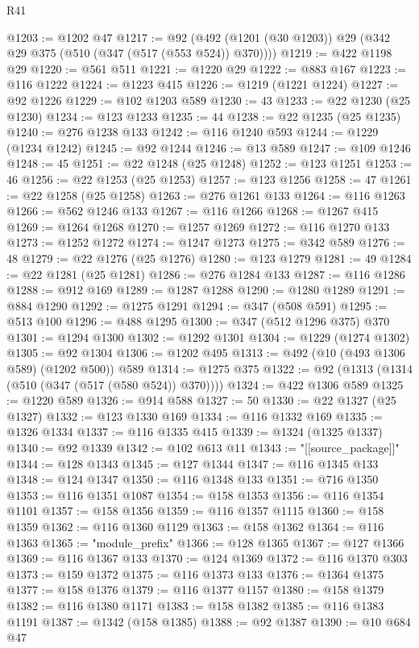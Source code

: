 \begin{lexlean}{R41}
\begin{coremodule}
@1203 := @1202 @47
@1217 := @92 (@492 (@1201 (@30 @1203)) @29 (@342 @29 @375 (@510 (@347 (@517 (@553 @524)) @370))))
@1219 := @422 @1198 @29
@1220 := @561 @511
@1221 := @1220 @29
@1222 := @883 @167
@1223 := @116 @1222
@1224 := @1223 @415
@1226 := @1219 (@1221 @1224)
@1227 := @92 @1226
@1229 := @102 @1203 @589
@1230 := 43
@1233 := @22 @1230 (@25 @1230)
@1234 := @123 @1233
@1235 := 44
@1238 := @22 @1235 (@25 @1235)
@1240 := @276 @1238 @133
@1242 := @116 @1240 @593
@1244 := @1229 (@1234 @1242)
@1245 := @92 @1244
@1246 := @13 @589
@1247 := @109 @1246
@1248 := 45
@1251 := @22 @1248 (@25 @1248)
@1252 := @123 @1251
@1253 := 46
@1256 := @22 @1253 (@25 @1253)
@1257 := @123 @1256
@1258 := 47
@1261 := @22 @1258 (@25 @1258)
@1263 := @276 @1261 @133
@1264 := @116 @1263
@1266 := @562 @1246 @133
@1267 := @116 @1266
@1268 := @1267 @415
@1269 := @1264 @1268
@1270 := @1257 @1269
@1272 := @116 @1270 @133
@1273 := @1252 @1272
@1274 := @1247 @1273
@1275 := @342 @589
@1276 := 48
@1279 := @22 @1276 (@25 @1276)
@1280 := @123 @1279
@1281 := 49
@1284 := @22 @1281 (@25 @1281)
@1286 := @276 @1284 @133
@1287 := @116 @1286
@1288 := @912 @169
@1289 := @1287 @1288
@1290 := @1280 @1289
@1291 := @884 @1290
@1292 := @1275 @1291
@1294 := @347 (@508 @591)
@1295 := @513 @100
@1296 := @488 @1295
@1300 := @347 (@512 @1296 @375) @370
@1301 := @1294 @1300
@1302 := @1292 @1301
@1304 := @1229 (@1274 @1302)
@1305 := @92 @1304
@1306 := @1202 @495
@1313 := @492 (@10 (@493 @1306 @589) (@1202 @500)) @589
@1314 := @1275 @375
@1322 := @92 (@1313 (@1314 (@510 (@347 (@517 (@580 @524)) @370))))
@1324 := @422 @1306 @589
@1325 := @1220 @589
@1326 := @914 @588
@1327 := 50
@1330 := @22 @1327 (@25 @1327)
@1332 := @123 @1330 @169
@1334 := @116 @1332 @169
@1335 := @1326 @1334
@1337 := @116 @1335 @415
@1339 := @1324 (@1325 @1337)
@1340 := @92 @1339
@1342 := @102 @613 @11
@1343 := "[[source_package]]"
@1344 := @128 @1343
@1345 := @127 @1344
@1347 := @116 @1345 @133
@1348 := @124 @1347
@1350 := @116 @1348 @133
@1351 := @716 @1350
@1353 := @116 @1351 @1087
@1354 := @158 @1353
@1356 := @116 @1354 @1101
@1357 := @158 @1356
@1359 := @116 @1357 @1115
@1360 := @158 @1359
@1362 := @116 @1360 @1129
@1363 := @158 @1362
@1364 := @116 @1363
@1365 := "module_prefix"
@1366 := @128 @1365
@1367 := @127 @1366
@1369 := @116 @1367 @133
@1370 := @124 @1369
@1372 := @116 @1370 @303
@1373 := @159 @1372
@1375 := @116 @1373 @133
@1376 := @1364 @1375
@1377 := @158 @1376
@1379 := @116 @1377 @1157
@1380 := @158 @1379
@1382 := @116 @1380 @1171
@1383 := @158 @1382
@1385 := @116 @1383 @1191
@1387 := @1342 (@158 @1385)
@1388 := @92 @1387
@1390 := @10 @684 @47

\end{coremodule}
\end{lexlean}
